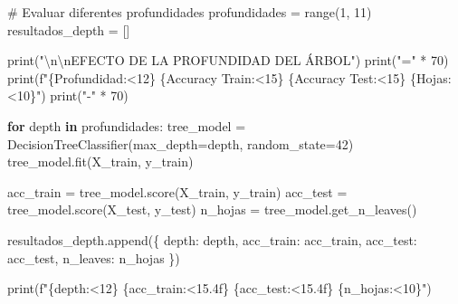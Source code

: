 \documentclass[
  doc,
  floatsintext,
  longtable,
  a4paper,
  nolmodern,
  notxfonts,
  notimes,
  12pt,
  colorlinks=true,linkcolor=blue,citecolor=blue,urlcolor=blue]{apa7}
\newenvironment{Shaded}{\begin{snugshade}}{\end{snugshade}}
\newcommand{\BuiltInTok}[1]{\textcolor[rgb]{0.00,0.23,0.31}{#1}}
\newcommand{\CharTok}[1]{\textcolor[rgb]{0.13,0.47,0.30}{#1}}
\newcommand{\CommentTok}[1]{\textcolor[rgb]{0.37,0.37,0.37}{#1}}
\newcommand{\ControlFlowTok}[1]{\textcolor[rgb]{0.00,0.23,0.31}{\textbf{#1}}}
\newcommand{\DecValTok}[1]{\textcolor[rgb]{0.68,0.00,0.00}{#1}}
\newcommand{\KeywordTok}[1]{\textcolor[rgb]{0.00,0.23,0.31}{\textbf{#1}}}
\newcommand{\NormalTok}[1]{\textcolor[rgb]{0.00,0.23,0.31}{#1}}
\newcommand{\OperatorTok}[1]{\textcolor[rgb]{0.37,0.37,0.37}{#1}}
\newcommand{\SpecialCharTok}[1]{\textcolor[rgb]{0.37,0.37,0.37}{#1}}
\newcommand{\SpecialStringTok}[1]{\textcolor[rgb]{0.13,0.47,0.30}{#1}}
\newcommand{\StringTok}[1]{\textcolor[rgb]{0.13,0.47,0.30}{#1}}
\begin{document}
\begin{Shaded}
\begin{Highlighting}[]
\CommentTok{\# Evaluar diferentes profundidades}
\NormalTok{profundidades }\OperatorTok{=} \BuiltInTok{range}\NormalTok{(}\DecValTok{1}\NormalTok{, }\DecValTok{11}\NormalTok{)}
\NormalTok{resultados\_depth }\OperatorTok{=}\NormalTok{ []}

\BuiltInTok{print}\NormalTok{(}\StringTok{"}\CharTok{\textbackslash{}n\textbackslash{}n}\StringTok{EFECTO DE LA PROFUNDIDAD DEL ÁRBOL"}\NormalTok{)}
\BuiltInTok{print}\NormalTok{(}\StringTok{"="} \OperatorTok{*} \DecValTok{70}\NormalTok{)}
\BuiltInTok{print}\NormalTok{(}\SpecialStringTok{f"}\SpecialCharTok{\{}\StringTok{\textquotesingle{}Profundidad\textquotesingle{}}\SpecialCharTok{:\textless{}12\}}\SpecialStringTok{ }\SpecialCharTok{\{}\StringTok{\textquotesingle{}Accuracy Train\textquotesingle{}}\SpecialCharTok{:\textless{}15\}}\SpecialStringTok{ }\SpecialCharTok{\{}\StringTok{\textquotesingle{}Accuracy Test\textquotesingle{}}\SpecialCharTok{:\textless{}15\}}\SpecialStringTok{ }\SpecialCharTok{\{}\StringTok{\textquotesingle{}Hojas\textquotesingle{}}\SpecialCharTok{:\textless{}10\}}\SpecialStringTok{"}\NormalTok{)}
\BuiltInTok{print}\NormalTok{(}\StringTok{"{-}"} \OperatorTok{*} \DecValTok{70}\NormalTok{)}

\ControlFlowTok{for}\NormalTok{ depth }\KeywordTok{in}\NormalTok{ profundidades:}
\NormalTok{    tree\_model }\OperatorTok{=}\NormalTok{ DecisionTreeClassifier(max\_depth}\OperatorTok{=}\NormalTok{depth, random\_state}\OperatorTok{=}\DecValTok{42}\NormalTok{)}
\NormalTok{    tree\_model.fit(X\_train, y\_train)}
    
\NormalTok{    acc\_train }\OperatorTok{=}\NormalTok{ tree\_model.score(X\_train, y\_train)}
\NormalTok{    acc\_test }\OperatorTok{=}\NormalTok{ tree\_model.score(X\_test, y\_test)}
\NormalTok{    n\_hojas }\OperatorTok{=}\NormalTok{ tree\_model.get\_n\_leaves()}
    
\NormalTok{    resultados\_depth.append(\{}
        \StringTok{\textquotesingle{}depth\textquotesingle{}}\NormalTok{: depth,}
        \StringTok{\textquotesingle{}acc\_train\textquotesingle{}}\NormalTok{: acc\_train,}
        \StringTok{\textquotesingle{}acc\_test\textquotesingle{}}\NormalTok{: acc\_test,}
        \StringTok{\textquotesingle{}n\_leaves\textquotesingle{}}\NormalTok{: n\_hojas}
\NormalTok{    \})}
    
    \BuiltInTok{print}\NormalTok{(}\SpecialStringTok{f"}\SpecialCharTok{\{}\NormalTok{depth}\SpecialCharTok{:\textless{}12\}}\SpecialStringTok{ }\SpecialCharTok{\{}\NormalTok{acc\_train}\SpecialCharTok{:\textless{}15.4f\}}\SpecialStringTok{ }\SpecialCharTok{\{}\NormalTok{acc\_test}\SpecialCharTok{:\textless{}15.4f\}}\SpecialStringTok{ }\SpecialCharTok{\{}\NormalTok{n\_hojas}\SpecialCharTok{:\textless{}10\}}\SpecialStringTok{"}\NormalTok{)}


\end{Highlighting}
\end{Shaded}
\end{document}
